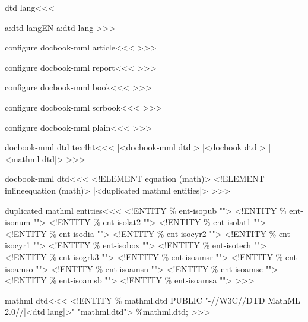 \<dtd lang\><<<
\expandafter
\ifx \csname a:dtd-lang\endcsname\relax EN\else
  \csname a:dtd-lang\endcsname
\fi
>>>



\<configure docbook-mml article\><<< 
   {}
   {}
>>>


\<configure docbook-mml report\><<< 
   {}
   {}
>>>


\<configure docbook-mml book\><<< 
   {}
   {}
>>>


\<configure docbook-mml scrbook\><<< 
   {}
   {}
>>>





\<configure docbook-mml plain\><<< 
   {}
   {}
>>>



\<docbook-mml dtd tex4ht\><<<
|<docbook-mml dtd|>%
|<docbook dtd|>%
|<mathml dtd|>%
>>>


\<docbook-mml dtd\><<<
<!ELEMENT equation (math)>\Hnewline
<!ELEMENT inlineequation (math)>\Hnewline
|<duplicated mathml entities|>%
>>>

\<duplicated mathml entities\><<<
<!ENTITY \% ent-isopub  "">
<!ENTITY \% ent-isonum  "">\Hnewline    
<!ENTITY \% ent-isolat2  "">
<!ENTITY \% ent-isolat1  "">\Hnewline    
<!ENTITY \% ent-isodia  "">
<!ENTITY \% ent-isocyr2  "">\Hnewline    
<!ENTITY \% ent-isocyr1  "">
<!ENTITY \% ent-isobox  "">\Hnewline    
<!ENTITY \% ent-isotech  "">
<!ENTITY \% ent-isogrk3  "">\Hnewline    
<!ENTITY \% ent-isoamsr  "">
<!ENTITY \% ent-isoamso  "">\Hnewline    
<!ENTITY \% ent-isoamsn  "">
<!ENTITY \% ent-isoamsc  "">\Hnewline    
<!ENTITY \% ent-isoamsb  "">
<!ENTITY \% ent-isoamsa  "">\Hnewline  
>>>



\<mathml dtd\><<<
<!ENTITY \% mathml.dtd PUBLIC
    "-//W3C//DTD MathML 2.0//|<dtd lang|>"\Hnewline\space\space
    "mathml.dtd">  
    \Hnewline \%mathml.dtd;\Hnewline
>>>







